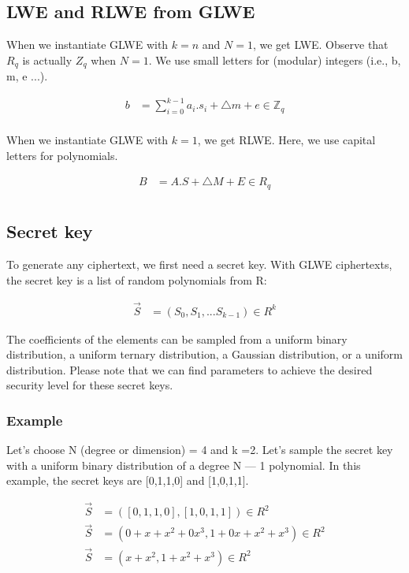 \documentclass{techrep}
\theoremstyle{definition}
\theoremstyle{plain}
\newcommand{\Z}{\mathbb{Z}}
\begin{document}
	\subsection{LWE and RLWE from GLWE }
 When we instantiate GLWE with $k = n$ and $N = 1$, we get LWE. Observe that $ R_q$ is actually $ Z_q$ when $ N = 1$. We use small letters for (modular) integers (i.e., b, m, e ...).

 	\begin{align*}
		b &= \sum_{i=0}^{k-1}a_i . s_i + \bigtriangleup m + e \in \Z_{q}  \\
	\end{align*}

When we instantiate GLWE with $k = 1$, we get RLWE. Here, we use capital letters for polynomials. 

	\begin{align*}
		B &= A . S + \bigtriangleup M + E \in R_q  \\
	\end{align*}


	\subsection{Secret key}
To generate any ciphertext, we first need a secret key. With  GLWE ciphertexts, the secret key is a list of 
 random polynomials from R:

	\begin{align*}
		\overrightarrow{S} &= (S_0,S_1,...S_{k-1}) \in R^k
	\end{align*}

The coefficients of the elements can be sampled from a uniform binary distribution, a uniform ternary distribution, a Gaussian distribution, or a uniform distribution. Please note that we can find parameters to achieve the desired security level for these secret keys.

\subsubsection{Example}

Let’s choose N (degree or dimension) = 4 and k =2. Let's sample the secret key with a uniform binary distribution of a degree N — 1 polynomial. In this example, the secret keys are [0,1,1,0] and [1,0,1,1].



\begin{align*} 
\overrightarrow{S} &= ([0,1,1,0],[1,0,1,1]) \in R^2 \\ 
\overrightarrow{S} &= (0 + x + x^2 + 0x^3,1 + 0x + x^2 + x^3) \in R^2 \\ 
\overrightarrow{S} &= (x + x^2, 1 + x^2 + x^3) \in R^2 \\ 
\end{align*}
\end{document}
